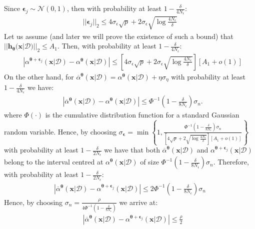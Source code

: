 \documentclass[jair,twoside,11pt,theapa]{article}
\theoremstyle{definition}
\begin{document}
Since $\bm{\epsilon}_j\sim\mathcal{N}(0,1)$, then with probability at least $1 - \frac{\delta}{4N_{\epsilon}}$:
\begin{align*}
    ||\bm{\epsilon}_j||_2 \le 4\sigma_{\epsilon}\sqrt{p} + 2\sigma_{\epsilon}\sqrt{\log\frac{4N_{\epsilon}}{\delta}}
\end{align*}
Let us assume (and later we will prove the existence of such a bound) that $||\bm{h}_{ \bm{\theta}}(\bm{x}|\mathcal{D})||_2 \le A_1$. Then, with probability at least $1 - \frac{\delta}{4N_{\epsilon}}$:
\begin{align*}
    &\left|\alpha^{\bm{\theta}+\bm{\epsilon}_j}(\bm{x}|\mathcal{D}) - \alpha^{\bm{\theta}}(\bm{x}|\mathcal{D})\right|\le \nonumber
    \left[4\sigma_{\epsilon}\sqrt{p} + 2\sigma_{\epsilon}\sqrt{\log\frac{4N_{\epsilon}}{\delta}}\right]\left[A_1 + o(1)\right]
\end{align*}
On the other hand, for $\overline{\alpha}^{\bm{\theta}} (\bm{x}|\mathcal{D}) = \alpha^{\bm{\theta}} (\bm{x}|\mathcal{D}) + \eta \sigma_{\eta}$ with probability at least $1 - \frac{\delta}{4N_{\epsilon}}$ we have:
\begin{align*}
    &\left|\overline{\alpha}^{\bm{\theta}} (\bm{x}|\mathcal{D}) - \alpha^{\bm{\theta}} (\bm{x}|\mathcal{D})\right| \le \Phi^{-1}\left(1 - \frac{\delta}{8N_{\epsilon}}\right)\sigma_{n}.
\end{align*}
where $\Phi(\cdot)$ is the cumulative distribution function for a standard Gaussian random variable. Hence, by choosing $\sigma_{\bm{\epsilon}} = \min\left\{1, \frac{\Phi^{-1}\left(1 - \frac{\delta}{8N_{\epsilon}}\right)\sigma_{n}}{\left[4\sqrt{p} + 2\sqrt{\log\frac{4N_{\epsilon}}{\delta}}\right]\left[A_1 + o(1)\right]}\right\}$ 
with probability at least $1 - \frac{\delta}{2N_\epsilon}$ we have that both $\overline{\alpha}^{\bm{\theta}} (\bm{x}|\mathcal{D})$ and $\alpha^{\bm{\theta}+\bm{\epsilon}_j}(\bm{x}|\mathcal{D})$ belong to the interval centred at $\alpha^{\bm{\theta}}(\bm{x}|\mathcal{D})$ of size $\Phi^{-1}\left(1 - \frac{\delta}{8N_{\epsilon}}\right)\sigma_{n}$. Therefore, with probability at least $1 - \frac{\delta}{2N_{\epsilon}}$:
\begin{align*}
    \left|\overline{\alpha}^{\bm{\theta}} (\bm{x}|\mathcal{D}) - \alpha^{\bm{\theta}+\bm{\epsilon}_j}(\bm{x}|\mathcal{D})\right| \le 2\Phi^{-1}\left(1 - \frac{\delta}{8N_{\epsilon}}\right)\sigma_{n}
\end{align*}
Hence, by choosing $\sigma_n = \frac{\rho}{4\Phi^{-1}\left(1 - \frac{\delta}{8N_{\epsilon}}\right)}$ we arrive at:
\begin{align*}
    &\left|\overline{\alpha}^{\bm{\theta}} (\bm{x}|\mathcal{D}) - \alpha^{\bm{\theta}+\bm{\epsilon}_j}(\bm{x}|\mathcal{D})\right| \le \frac{\rho}{2}
\end{align*}
\end{document}
